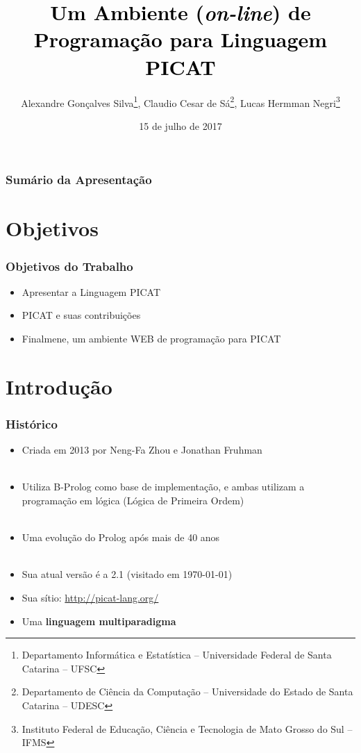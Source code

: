 \documentclass[brazil]{beamer}
\title[Picat]{\fontsize{15}{20}\selectfont \textcolor{black}{Um Ambiente (\textit{on-line}) de Programação  para Linguagem PICAT}}
\author{Alexandre Gonçalves Silva\footnote{Departamento Informática e Estatística -- Universidade Federal de Santa Catarina -- UFSC}, Claudio Cesar de Sá\footnote{Departamento de Ciência da Computação -- Universidade do Estado de Santa Catarina -- UDESC}, Lucas Hermman Negri\footnote{Instituto Federal de Educação, Ciência e Tecnologia de Mato Grosso do Sul -- IFMS}}
\institute{}
\date{15 de julho de 2017}
\begin{document}
\begin{frame}
    \titlepage
\end{frame}


\begin{frame}[fragile]
\frametitle{Sumário da Apresentação}
\tableofcontents
\end{frame}



\section{Objetivos}


\begin{frame}

    \frametitle{Objetivos do Trabalho}

    \begin{itemize}
      \item Apresentar a Linguagem PICAT
      \item PICAT e suas contribuições
      \item Finalmene, um  ambiente WEB de programação para PICAT
    \end{itemize}
\end{frame}


\section{Introdução}
\begin{frame}

    \frametitle{Histórico}

    \begin{itemize}
      \item Criada em 2013 por Neng-Fa Zhou e Jonathan Fruhman \\~\\

      \item Utiliza B-Prolog como base de implementação, e ambas utilizam 
      a programação em lógica (Lógica de Primeira Ordem) \\~\\

      \item Uma evolução do Prolog após mais de 40 anos \\~\\

      \item Sua atual versão é a 2.1 (visitado em \today)

      \item Sua sítio: \url{http://picat-lang.org/}
      
      \item Uma \textbf{linguagem multiparadigma}
    \end{itemize}
\end{frame}
\end{document}
